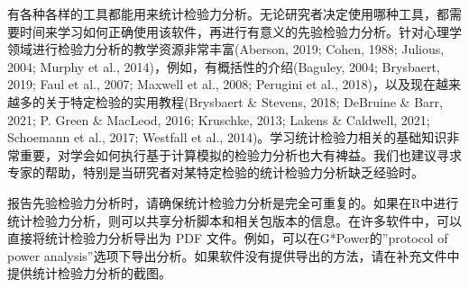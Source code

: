 \documentclass[
  letterpaper,
  DIV=11,
  numbers=noendperiod]{scrreprt}
\newenvironment{Shaded}{\begin{snugshade}}{\end{snugshade}}
\newcommand{\AttributeTok}[1]{\textcolor[rgb]{0.40,0.45,0.13}{#1}}
\newcommand{\CommentTok}[1]{\textcolor[rgb]{0.37,0.37,0.37}{#1}}
\newcommand{\ControlFlowTok}[1]{\textcolor[rgb]{0.00,0.23,0.31}{#1}}
\newcommand{\DecValTok}[1]{\textcolor[rgb]{0.68,0.00,0.00}{#1}}
\newcommand{\FloatTok}[1]{\textcolor[rgb]{0.68,0.00,0.00}{#1}}
\newcommand{\FunctionTok}[1]{\textcolor[rgb]{0.28,0.35,0.67}{#1}}
\newcommand{\NormalTok}[1]{\textcolor[rgb]{0.00,0.23,0.31}{#1}}
\newcommand{\OtherTok}[1]{\textcolor[rgb]{0.00,0.23,0.31}{#1}}
\newcommand{\SpecialCharTok}[1]{\textcolor[rgb]{0.37,0.37,0.37}{#1}}
\begin{document}
\begin{Shaded}
\end{Shaded}

有各种各样的工具都能用来统计检验力分析。无论研究者决定使用哪种工具，都需要时间来学习如何正确使用该软件，再进行有意义的先验检验力分析。针对心理学领域进行检验力分析的教学资源非常丰富(Aberson,
2019; Cohen, 1988; Julious, 2004; Murphy et al.,
2014)，例如，有概括性的介绍(Baguley, 2004; Brysbaert, 2019; Faul et al.,
2007; Maxwell et al., 2008; Perugini et al.,
2018)，以及现在越来越多的关于特定检验的实用教程(Brysbaert \& Stevens,
2018; DeBruine \& Barr, 2021; P. Green \& MacLeod, 2016; Kruschke, 2013;
Lakens \& Caldwell, 2021; Schoemann et al., 2017; Westfall et al.,
2014)。学习统计检验力相关的基础知识非常重要，对学会如何执行基于计算模拟的检验力分析也大有裨益。我们也建议寻求专家的帮助，特别是当研究者对某特定检验的统计检验力分析缺乏经验时。

报告先验检验力分析时，请确保统计检验力分析是完全可重复的。如果在R中进行统计检验力分析，则可以共享分析脚本和相关包版本的信息。在许多软件中，可以直接将统计检验力分析导出为
PDF 文件。例如，可以在G*Power的''protocol of power
analysis''选项下导出分析。如果软件没有提供导出的方法，请在补充文件中提供统计检验力分析的截图。
\end{document}
